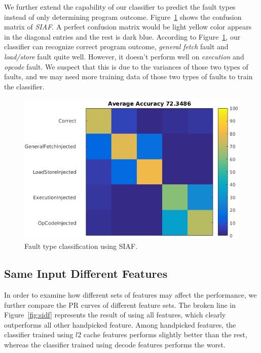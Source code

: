We further extend the capability of our classifier to predict the fault types instead of only determining program outcome.
Figure~\ref{fig:siaf-multi} shows the confusion matrix of \emph{SIAF}. A perfect confusion matrix would be light yellow color appears in the diagonal entries and the rest is dark blue. According to Figure~\ref{fig:siaf-multi}, our classifier can recognize correct program outcome, \emph{general fetch} fault and \emph{load/store} fault quite well. However, it doesn't perform well on \emph{execution} and \emph{opcode} fault. We suspect that this is due to the variances of those two types of faults, and we may need more training data of those two types of faults to train the classifier.

\begin{figure}[ht]
\begin{center}
   \includegraphics[width=0.8\linewidth]{./figures/siaf_multi.png}
\end{center}
\vspace{-0.3cm}
   \caption{Fault type classification using SIAF.}
\label{fig:siaf-multi}
\vspace{-0.3cm}
\end{figure}

\subsection{Same Input Different Features}
In order to examine how different sets of features may affect the performance, we further compare the PR curves of different feature sets. The broken line in Figure~\ref{fig:sidf} represents the result of using all features, which clearly outperforms all other handpicked feature. Among handpicked features, the classifier trained using $l2$ cache features performs slightly better than the rest, whereas the classifier trained using decode features performs the worst.

